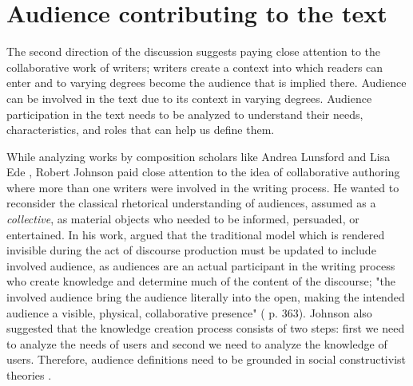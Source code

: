 \section{Audience contributing to the text}
The second direction of the discussion suggests paying close attention to the collaborative work of writers; writers create a context into which readers can enter and to varying degrees become the audience that is implied there. Audience can be involved in the text due to its context in varying degrees. Audience participation in the text needs to be analyzed to understand their needs, characteristics, and roles that can help us define them.

While analyzing works by composition scholars like Andrea Lunsford and Lisa Ede \cite{ede1984audience}, Robert Johnson \cite{johnson1997audience} paid close attention to the idea of collaborative authoring where more than one writers were involved in the writing process. He wanted to reconsider the classical rhetorical understanding of audiences, assumed as a \textit{collective}, as material objects who needed to be informed, persuaded, or entertained. In his work, \textcite{johnson1997audience} argued that the traditional model which is rendered invisible during the act of discourse production must be updated to include involved audience, as audiences are an actual participant in the writing process who create knowledge and determine much of the content of the discourse; "the involved audience bring the audience literally into the open, making the intended audience a visible, physical, collaborative presence" (\cite{johnson1997audience} p. 363). Johnson also suggested that the knowledge creation process consists of two steps: first we need to analyze the needs of users and second we need to analyze the knowledge of users. Therefore, audience definitions need to be grounded in social constructivist theories \cite{johnson1997audience}.

